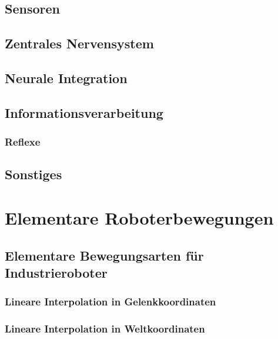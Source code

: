 \documentclass[a4paper, 11pt, accentcolor = tud3b]{tudreport}
\begin{document}
			\subsection{Sensoren} %

			\subsection{Zentrales Nervensystem} %

			\subsection{Neurale Integration} %

			\subsection{Informationsverarbeitung} %

				\subsubsection{Reflexe} %

			\subsection{Sonstiges} %

		\section{Elementare Roboterbewegungen} %

			\subsection{Elementare Bewegungsarten für Industrieroboter} %

				\subsubsection{Lineare Interpolation in Gelenkkoordinaten} %

				\subsubsection{Lineare Interpolation in Weltkoordinaten} %
\end{document}
